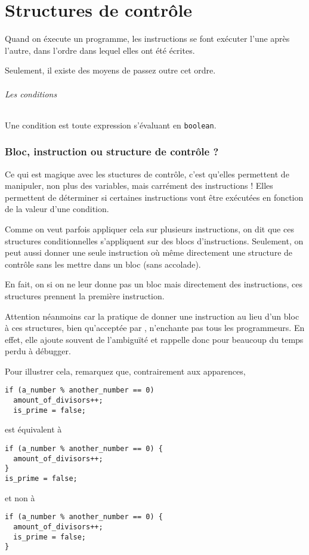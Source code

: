 \part{Structures de contrôle}
Quand on éxecute un programme, les instructions se font exécuter l'une après
l'autre, dans l'ordre dans lequel elles ont été écrites.

Seulement, il existe des moyens de passez outre cet ordre.

\paragraph{Les conditions}
Une condition est toute expression s'évaluant en \verb|boolean|.

\section{Bloc, instruction ou structure de contrôle ?}
\label{sec:bloci}
Ce qui est magique avec les stuctures de contrôle, c'est qu'elles permettent
de manipuler, non plus des variables, mais carrément des instructions !
Elles permettent de déterminer si certaines instructions vont être exécutées
en fonction de la valeur d'une condition.

Comme on veut parfois appliquer cela sur plusieurs instructions,
on dit que ces structures conditionnelles s'appliquent sur
des blocs d'instructions.
Seulement, on peut aussi donner une seule instruction où même directement
une structure de contrôle sans les mettre dans un bloc (sans accolade).

En fait, on si on ne leur donne pas un bloc mais directement des instructions,
ces structures prennent la première instruction.

Attention néanmoins car la pratique de donner une instruction au lieu d'un
bloc à ces structures, bien qu'acceptée par \java{}, n'enchante pas
tous les programmeurs.
En effet, elle ajoute souvent de l'ambiguïté et rappelle donc pour beaucoup
du temps perdu à débugger.

Pour illustrer cela, remarquez que, contrairement aux apparences,
\begin{lstlisting}
if (a_number % another_number == 0)
  amount_of_divisors++;
  is_prime = false;
\end{lstlisting}
est équivalent à
\begin{lstlisting}
if (a_number % another_number == 0) {
  amount_of_divisors++;
}
is_prime = false;
\end{lstlisting}
et non à
\begin{lstlisting}
if (a_number % another_number == 0) {
  amount_of_divisors++;
  is_prime = false;
}
\end{lstlisting}

